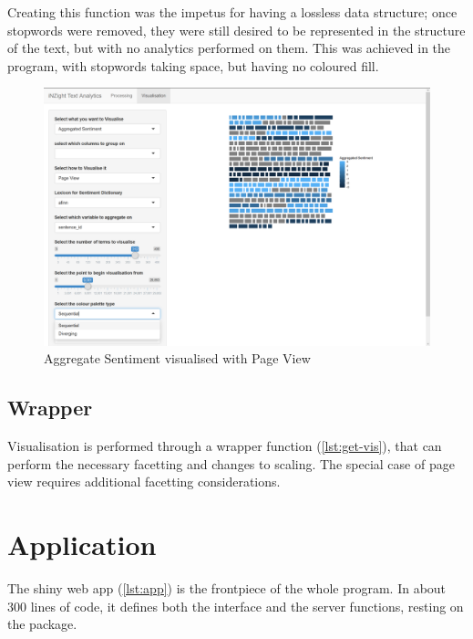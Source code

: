 \documentclass[11pt, a4paper, twoside, titlepage]{report}
\begin{document}
Creating this function was the impetus for having a lossless data
structure; once stopwords were removed, they were still desired to be
represented in the structure of the text, but with no analytics
performed on them. This was achieved in the program, with stopwords
taking space, but having no coloured fill.

\begin{figure}
\centering
\includegraphics[scale=0.35]{visualisation-agg-sent-pageview.png}
\caption{Aggregate Sentiment visualised with Page View\label{fig:visualisation-agg-sent-pageview}}
\end{figure}

\subsection{Wrapper}\label{sec:wrapper-1}

Visualisation is performed through a wrapper function
(\cref{lst:get-vis}), that can perform the necessary facetting
and changes to scaling. The special case of page view requires
additional facetting considerations.

\section{Application}\label{sec:application}

The shiny web app (\cref{lst:app}) is the frontpiece of the
whole program. In about 300 lines of code, it defines both the
interface and the server functions, resting on the package.
\end{document}
